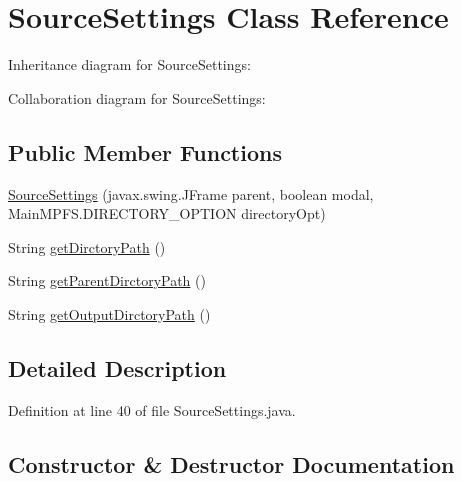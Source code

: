 \hypertarget{class_microchip_m_p_f_s_1_1_source_settings}{}\section{Source\+Settings Class Reference}
\label{class_microchip_m_p_f_s_1_1_source_settings}


Inheritance diagram for Source\+Settings\+:


Collaboration diagram for Source\+Settings\+:
\subsection*{Public Member Functions}
\begin{DoxyCompactItemize}
\item 
\hyperlink{class_microchip_m_p_f_s_1_1_source_settings_a9e970466b8f41a765730ab26df9df9bb}{Source\+Settings} (javax.\+swing.\+J\+Frame parent, boolean modal, Main\+M\+P\+F\+S.\+D\+I\+R\+E\+C\+T\+O\+R\+Y\+\_\+\+O\+P\+T\+I\+O\+N directory\+Opt)
\item 
String \hyperlink{class_microchip_m_p_f_s_1_1_source_settings_ab87fb0a0dcbbaaf909d70f5d82fb373c}{get\+Dirctory\+Path} ()
\item 
String \hyperlink{class_microchip_m_p_f_s_1_1_source_settings_a8ec1947dab1fbd6535cbb05967c92a45}{get\+Parent\+Dirctory\+Path} ()
\item 
String \hyperlink{class_microchip_m_p_f_s_1_1_source_settings_a7ac940c736c37536acbe270f0907ac38}{get\+Output\+Dirctory\+Path} ()
\end{DoxyCompactItemize}


\subsection{Detailed Description}


Definition at line 40 of file Source\+Settings.\+java.



\subsection{Constructor \& Destructor Documentation}
\hypertarget{class_microchip_m_p_f_s_1_1_source_settings_a9e970466b8f41a765730ab26df9df9bb}{}
